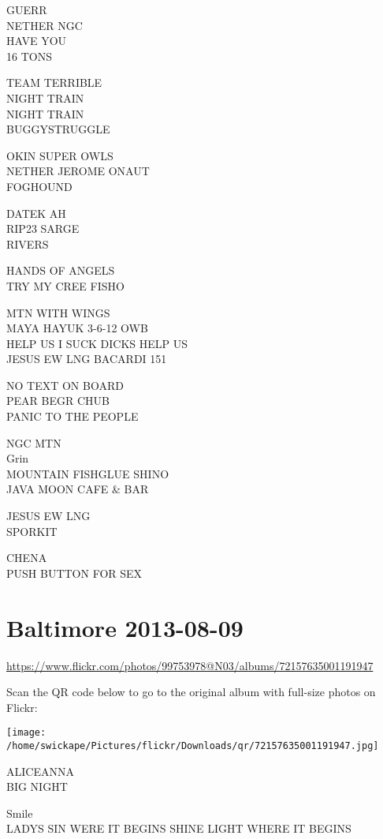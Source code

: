 \documentclass[10pt,letterpaper]{article}
\begin{document}
GUERR\\
NETHER NGC\\
HAVE YOU\\
16 TONS

TEAM TERRIBLE\\
NIGHT TRAIN\\
NIGHT TRAIN\\
BUGGYSTRUGGLE

OKIN SUPER OWLS\\
NETHER JEROME ONAUT\\
FOGHOUND

DATEK AH\\
RIP23 SARGE\\
RIVERS

HANDS OF ANGELS\\
TRY MY CREE FISHO

MTN WITH WINGS\\
MAYA HAYUK 3{-}6{-}12 OWB\\
HELP US I SUCK DICKS HELP US\\
JESUS EW LNG BACARDI 151

NO TEXT ON BOARD\\
PEAR BEGR CHUB\\
PANIC TO THE PEOPLE

NGC MTN\\
Grin\\
MOUNTAIN FISHGLUE SHINO\\
JAVA MOON CAFE \& BAR

JESUS EW LNG\\
SPORKIT

CHENA\\
PUSH BUTTON FOR SEX
\pagebreak

\section*{Baltimore 2013-08-09}

\url{https://www.flickr.com/photos/99753978@N03/albums/72157635001191947}

Scan the QR code below to go to the original album with full-size photos on Flickr:

\texttt{[image: /home/swickape/Pictures/flickr/Downloads/qr/72157635001191947.jpg]}
\pagebreak

ALICEANNA\\
BIG NIGHT

Smile\\
LADYS SIN WERE IT BEGINS SHINE LIGHT WHERE IT BEGINS
\end{document}
